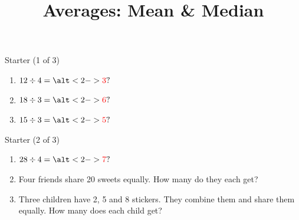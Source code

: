 \documentclass{beamer}
\title{Averages: Mean \& Median}
\author{}
\date{}
\newcommand{\ashow}[1]{\uncover<2->{\textcolor{red}{\small #1}}}
\newcommand{\ashowq}[1]{\alt<2->{\textcolor{red}{\small #1}}{?}}
\begin{document}
\frame{\titlepage}

\begin{frame}{Starter (1 of 3)}
\footnotesize
\begin{enumerate}\itemsep1pt
  \item $12 \div 4 = \ashowq{3}$
  \item $18 \div 3 = \ashowq{6}$
  \item $15 \div 3 = \ashowq{5}$
\end{enumerate}
\end{frame}

\begin{frame}{Starter (2 of 3)}
\footnotesize
\begin{enumerate}\itemsep1pt
  \setcounter{enumi}{3}
  \item $28 \div 4 = \ashowq{7}$
  \item Four friends share 20 sweets equally. How many do they each get? \ashow{5 sweets}
  \item Three children have 2, 5 and 8 stickers. They combine them and share them equally. How many does each child get? \ashow{5 stickers}
\end{enumerate}
\end{frame}
\end{document}

